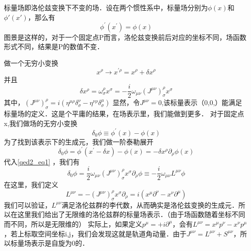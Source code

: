 
\begin{definition}{}
标量场即洛伦兹变换下不变的场．设在两个惯性系中，标量场分别为$\phi(x)$和$\phi'(x')$，那么有
\begin{equation}
\phi^{\prime}\left(x^{\prime}\right)=\phi(x)
\end{equation}
图景是这样的，对于一个固定点P而言，洛伦兹变换前后对应的坐标不同，场函数形式不同，结果是P的数值不变．
\end{definition}
\begin{corollary}{}
做一个无穷小变换
\begin{equation}
x^{\rho} \rightarrow x^{\prime \rho}=x^{\rho}+\delta x^{\rho}
\end{equation}
并且
\begin{equation}\label{qed2_eq1}
\delta x^{\rho}=\omega_{\sigma}^{\rho} x^{\sigma}=-\frac{i}{2} \omega_{\mu \nu}\left(J^{\mu \nu}\right)_{\sigma}^{\rho} x^{\sigma}
\end{equation}
其中，$\left(J^{\mu \nu}\right)_{\sigma}^{\rho}=i\left(\eta^{\mu \rho} \delta_{\sigma}^{\nu}-\eta^{\nu \rho} \delta_{\sigma}^{\mu}\right)$
显然，令$J^{\mu \nu}=0$,该标量表示（0,0,）能满足标量场的定义．这是个平庸的结果，在场表示里，我们能做到更多．
对于固定点x,我们做场的无穷小变换
\begin{equation}
\delta_{0} \phi \equiv \phi^{\prime}(x)-\phi(x)
\end{equation}
为了找到该表示下的生成元，我们做一阶泰勒展开
\begin{equation}
\delta_{0} \phi=\phi^{\prime}\left(x^{\prime}-\delta x\right)-\phi(x)=-\delta x^{\rho} \partial_{\rho} \phi(x)
\end{equation}
代入\autoref{qed2_eq1} ，我们有
\begin{equation}
\delta_{0} \phi=\frac{i}{2} \omega_{\mu \nu}\left(J^{\mu \nu}\right)_{\sigma}^{\rho} x^{\sigma} \partial_{\rho} \phi \equiv-\frac{i}{2} \omega_{\mu \nu} L^{\mu \nu} \phi
\end{equation}
在这里，我们定义
\begin{equation}
L^{\mu \nu}=-\left(J^{\mu \nu}\right)_{\sigma}^{\rho} x^{\sigma} \partial_{\rho}=i\left(x^{\mu} \partial^{\nu}-x^{\nu} \partial^{\mu}\right)
\end{equation}
我们可以验证，$L^{\mu \nu}$满足洛伦兹群的李代数，从而确实是洛伦兹变换的生成元．所以在这里我们给出了无限维的洛伦兹群的标量场表示．（由于场函数随着坐标不同而不同，所以是无限维的）
实际上，如果定义$p^{\mu}=+i \partial^{\mu}$，会有$L^{\mu \nu}=x^{\mu} p^{\nu}-x^{\nu} p^{\mu}$，若上标取空间坐标i,j，我们会发现这就是轨道角动量．由于$J^{\mu \nu}=L^{\mu \nu}+S^{\mu \nu}$，所以标量场表示是自旋为0的．
\end{corollary}
